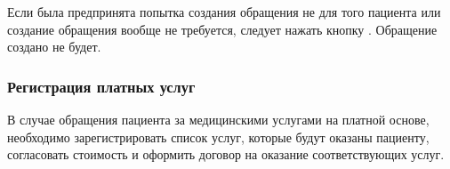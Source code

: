 Если была предпринята попытка создания обращения не для того пациента или создание обращения вообще не требуется, следует нажать кнопку . Обращение создано не будет.

\subsubsection{Регистрация платных услуг}

В случае обращения пациента за медицинскими услугами на платной основе, необходимо зарегистрировать список услуг, которые будут оказаны пациенту, согласовать стоимость и оформить договор на оказание соответствующих услуг.